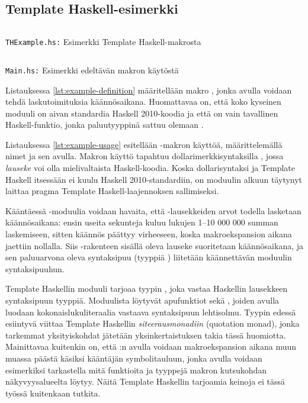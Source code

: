 \subsection{Template Haskell-esimerkki}

\begin{listing}[H]
    \inputminted{haskell}{codes/compile-time-eval-example/THExample.hs}
    \label{lst:example-definition}
    \caption{\texttt{THExample.hs:} Esimerkki Template Haskell-makrosta}
\end{listing}

\begin{listing}[H]
    \inputminted{haskell}{codes/compile-time-eval-example/Main.hs}
    \label{lst:example-usage}
    \caption{\texttt{Main.hs:} Esimerkki edeltävän makron käytöstä}
\end{listing}

Listauksessa \ref{lst:example-definition} määritellään makro ,
jonka avulla voidaan tehdä laskutoimituksia käännösaikana.
Huomattavaa on, että koko kyseinen moduuli on aivan standardia Haskell 2010-koodia
ja että  on vain tavallinen Haskell-funktio,
jonka paluutyyppinä sattuu olemaan .

Listauksessa \ref{lst:example-usage} esitellään -makron käyttöä,
mää\-rit\-tele\-mäl\-lä nimet  ja  sen avulla.
Makron käyttö tapahtuu dollarimerkkisyntaksilla ,
jossa \emph{lauseke} voi olla mielivaltaista Haskell-koodia.
Koska dollarisyntaksi ja Template Haskell itsessään ei kuulu Haskell 2010-standardiin,
on moduulin alkuun täytynyt laittaa pragma 
Template Haskell-laajennoksen sallimiseksi.

Kääntäessä -moduulia voidaan havaita,
että -lausekkeiden arvot todella lasketaan käännösaikana:
ensin useita sekunteja kuluu lukujen 1--10 000 000 summan laskemiseen,
sitten käännös päättyy virheeseen,
koska makroekspansion aikana jaettiin nollalla.
Siis \Haskell{\$()}-rakenteen sisällä oleva lauseke suoritetaan käännösaikana,
ja sen paluuarvona oleva syntaksipuu (tyyppiä ) liitetään käännettävän moduulin
syntaksipuuhun.

Template Haskellin moduuli  tarjoaa tyypin ,
joka vastaa Haskellin lausekkeen syntaksipuun tyyppiä.
Moduulista  löytyvät apufunktiot 
sekä ,
joiden avulla luodaan kokonaislukuliteraalia vastaava syntaksipuun lehtisolmu.
Tyypin  edessä esiintyvä  viittaa Template Haskellin
\emph{siteerausmonadiin} (quotation monad),
jonka tarkemmat yksityiskohdat jätetään yksinkertaistuksen takia tässä huomiotta.
Mainittavaa kuitenkin on,
että :n avulla voidaan makroekspansion aikana muun muassa päästä käsiksi kääntäjän symbolitauluun,
jonka avulla voidaan esimerkiksi tarkastella mitä funktioita ja tyyppejä makron kutsukohdan näkyvyysalueelta
löytyy. Näitä Template Haskellin tarjoamia keinoja ei tässä työssä kuitenkaan tutkita.

